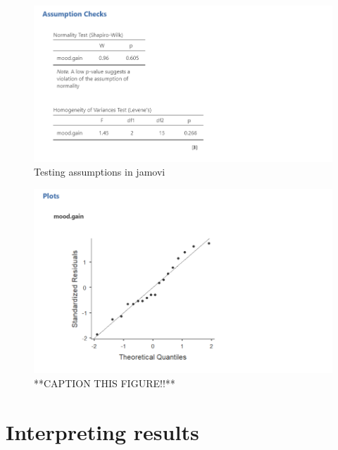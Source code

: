 \documentclass[
]{book}
\begin{document}
\begin{figure}

{\centering \includegraphics[width=1\linewidth]{images/04_one-way-anova/one-way_assumptions1} 

}

\caption{Testing assumptions in jamovi}\label{fig:unnamed-chunk-3}
\end{figure}

\begin{figure}

{\centering \includegraphics[width=1\linewidth]{images/04_one-way-anova/one-way_assumptions2} 

}

\caption{**CAPTION THIS FIGURE!!**}\label{fig:unnamed-chunk-4}
\end{figure}

\hypertarget{interpreting-results-2}{%
\section{Interpreting results}\label{interpreting-results-2}}
\end{document}
